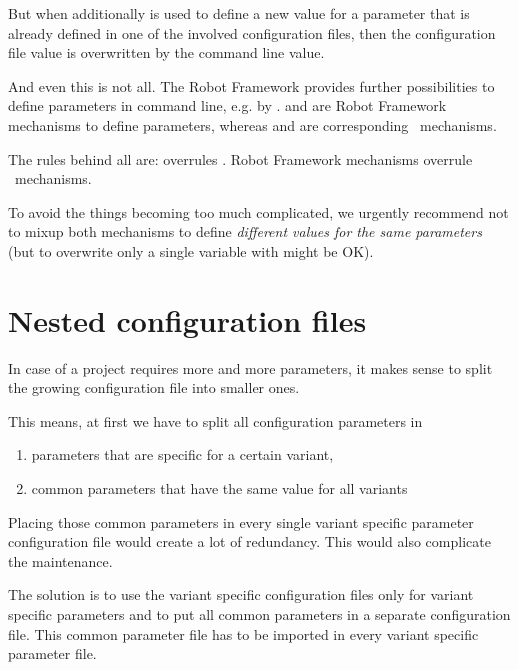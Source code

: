 But when additionally  is used to define a new value for a parameter that is already defined in one of the involved configuration files,
then the configuration file value is overwritten by the command line value.

\vspace{2ex}

And even this is not all. The Robot Framework provides further possibilities to define parameters in command line, e.g. by
.  and  are Robot Framework mechanisms to define parameters, whereas
 and  are corresponding \pkg\ mechanisms.

The rules behind all are:  overrules . Robot Framework mechanisms overrule \pkg\ mechanisms.

To avoid the things becoming too much complicated, we urgently recommend not to mixup both mechanisms to define \textit{different values for the same parameters}
(but to overwrite only a single variable with  might be OK).

\newpage

\section{Nested configuration files}

In case of a project requires more and more parameters, it makes sense to split the growing configuration file into smaller ones.

This means, at first we have to split all configuration parameters in
\begin{enumerate}
   \item parameters that are specific for a certain variant,
   \item common parameters that have the same value for all variants
\end{enumerate}

Placing those common parameters in every single variant specific parameter configuration file would create a lot of redundancy.
This would also complicate the maintenance.

The solution is to use the variant specific configuration files only for variant specific parameters and to put all common parameters in
a separate configuration file. This common parameter file has to be imported in every variant specific parameter file.

